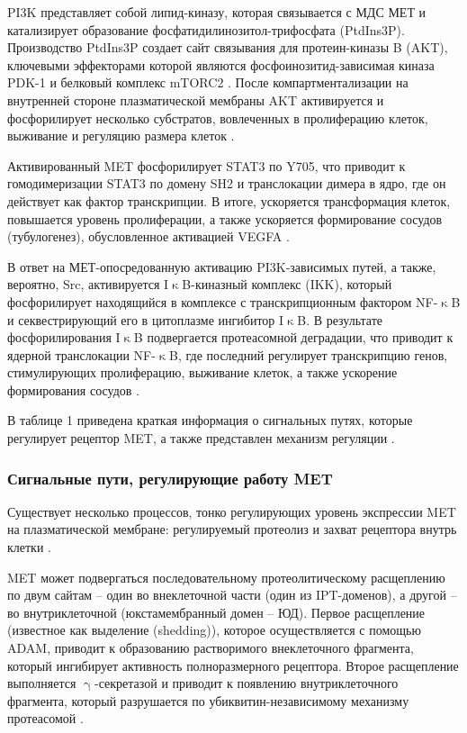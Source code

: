 PI3K представляет собой липид-киназу, которая связывается с МДС МЕТ и катализирует образование фосфатидилинозитол-трифосфата (PtdIns3P). Производство PtdIns3P создает сайт связывания для протеин-киназы B (AKT), ключевыми эффекторами которой являются фосфоинозитид-зависимая киназа PDK-1 и белковый комплекс mTORC2 \cite{garcia-vilas_updates_2018}. После компартментализации на внутренней стороне плазматической мембраны AKT активируется и фосфорилирует несколько субстратов, вовлеченных в пролиферацию клеток, выживание и регуляцию размера клеток \cite{trusolino_met_2010}.

Активированный MET фосфорилирует STAT3 по Y705, что приводит к гомодимеризации STAT3 по домену SH2 и транслокации димера в ядро, где он действует как фактор транскрипции. В итоге, ускоряется трансформация клеток, повышается уровень пролиферации, а также ускоряется формирование сосудов (тубулогенез), обусловленное активацией VEGFA \cite{trusolino_met_2010}.

В ответ на МЕТ-опосредованную активацию PI3K-зависимых путей, а также, вероятно, Src, активируется I$\upkappa$B-киназный комплекс (IKK), который фосфорилирует находящийся в комплексе с транскрипционным фактором NF-$\upkappa$B и секвестрирующий его в цитоплазме ингибитор I$\upkappa$B. В результате фосфорилирования I$\upkappa$B подвергается протеасомной деградации, что приводит к ядерной транслокации NF-$\upkappa$B, где последний регулирует транскрипцию генов, стимулирующих пролиферацию, выживание клеток, а также ускорение формирования сосудов \cite{trusolino_met_2010}.

В таблице 1 приведена краткая информация о сигнальных путях, которые регулирует рецептор MET, а также представлен механизм регуляции \cite{trusolino_met_2010, gherardi_targeting_2012}.

\subsubsection{Сигнальные пути, регулирующие работу MET}

Существует несколько процессов, тонко регулирующих уровень экспрессии MET на плазматической мембране: регулируемый протеолиз и захват рецептора внутрь клетки \cite{trusolino_met_2010}. 

MET может подвергаться последовательному протеолитическому расщеплению по двум сайтам – один во внеклеточной части (один из IPT-доменов), а другой – во внутриклеточной (юкстамембранный домен – ЮД). Первое расщепление (известное как выделение (shedding)), которое осуществляется с помощью ADAM, приводит к образованию растворимого внеклеточного фрагмента, который ингибирует активность полноразмерного рецептора. Второе расщепление выполняется $\upgamma$-секретазой и приводит к появлению внутриклеточного фрагмента, который разрушается по убиквитин-независимому механизму протеасомой \cite{foveau_down-regulation_2009}.

